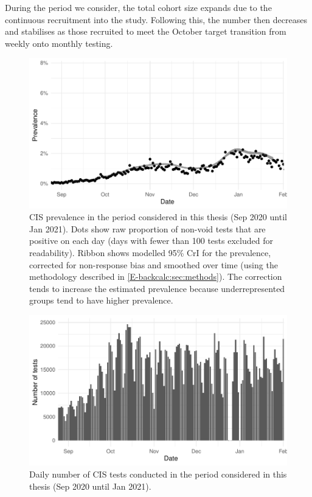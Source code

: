 \documentclass[thesis.tex]{subfiles}
\begin{document}
During the period we consider, the total cohort size expands due to the continuous recruitment into the study.
Following this, the number then decreases and stabilises as those recruited to meet the October target transition from weekly onto monthly testing.


\begin{figure}
  \centering \includegraphics[width=\textwidth]{biology-data/CIS-positivity}
  \caption[CIS prevalence]{%
    CIS prevalence in the period considered in this thesis (Sep 2020 until Jan 2021).
    Dots show raw proportion of non-void tests that are positive on each day (days with fewer than 100 tests excluded for readability).
    Ribbon shows modelled 95\% CrI for the prevalence, corrected for non-response bias and smoothed over time (using the methodology described in \cref{E-backcalc:sec:methods}).
    The correction tends to increase the estimated prevalence because underrepresented groups tend to have higher prevalence.
  }
\end{figure}
\begin{figure}
  \centering \includegraphics[width=\textwidth]{biology-data/CIS-num-tests}
  \caption[Number of CIS tests]{%
    Daily number of CIS tests conducted in the period considered in this thesis (Sep 2020 until Jan 2021).
  }
\end{figure}
\end{document}
